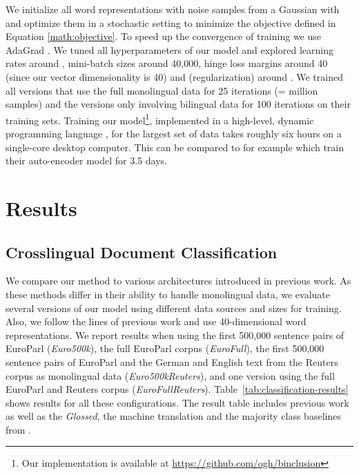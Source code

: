\documentclass{article} \usepackage{iclr2015,times}
\begin{document}
We initialize all word representations with noise samples from a Gaussian
with  and optimize them in a stochastic setting
to minimize the objective defined in Equation \ref{math:objective}.
To speed up the convergence of training we use AdaGrad
\citep{duchi2011adaptive}. We tuned all hyperparameters of our model
and explored learning rates around , mini-batch sizes around 40,000,
hinge loss margins around 40 (since our vector dimensionality is 40) and
 (regularization) around . We trained all versions
that use the full monolingual data for 25 iterations
(=  million samples) and the versions only involving bilingual
data for 100 iterations on their training sets.
Training our model\footnote{Our implementation is available at \url{https://github.com/ogh/binclusion}}, implemented in a high-level, dynamic programming language
\citep{bezanson2012julia}, for the largest set of data takes roughly
six hours on a single-core desktop computer.
This can be compared to for example \citet{chandar2014autoencoder} which train
their auto-encoder model for 3.5 days.

\section{Results}

\subsection{Crosslingual Document Classification}

We compare our method to various architectures introduced in previous work.
As these methods differ in their ability to handle monolingual data,
we evaluate several versions of our model using different data sources and
sizes for training.
Also, we follow the lines of previous work and use 40-dimensional
word representations.
We report results when
using
the first 500,000 sentence pairs of EuroParl (\emph{Euro500k}),
the full EuroParl corpus (\emph{EuroFull}),
the first 500,000 sentence pairs of EuroParl and the German and English text
    from the Reuters corpus as monolingual data (\emph{Euro500kReuters}),
and one version using the full EuroParl
    and Reuters corpus (\emph{EuroFullReuters}).
Table~\ref{tab:classification-results} shows results for all these
configurations.
The result table includes previous work as well as the
\emph{Glossed}, the machine translation and the majority class
baselines from \citet{klementiev2012inducing}.
\end{document}
